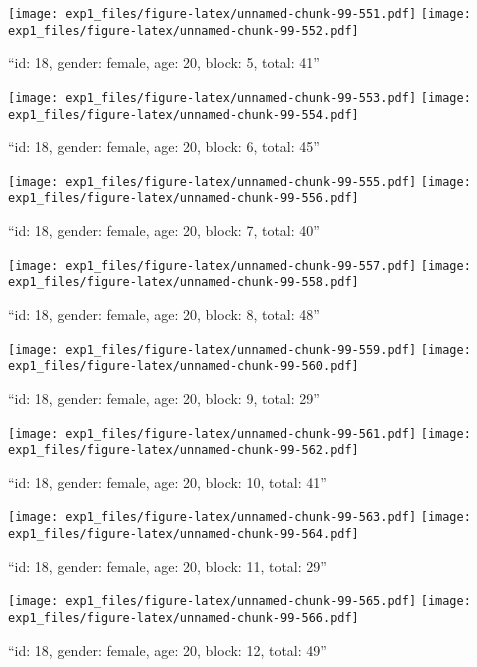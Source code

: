 \documentclass[,]{article}
\begin{document}
\texttt{[image: exp1\_files/figure-latex/unnamed-chunk-99-551.pdf]}
\texttt{[image: exp1\_files/figure-latex/unnamed-chunk-99-552.pdf]}

\newpage
[1] 

``id: 18, gender: female, age: 20, block: 5, total: 41''

\texttt{[image: exp1\_files/figure-latex/unnamed-chunk-99-553.pdf]}
\texttt{[image: exp1\_files/figure-latex/unnamed-chunk-99-554.pdf]}

\newpage
[1] 

``id: 18, gender: female, age: 20, block: 6, total: 45''

\texttt{[image: exp1\_files/figure-latex/unnamed-chunk-99-555.pdf]}
\texttt{[image: exp1\_files/figure-latex/unnamed-chunk-99-556.pdf]}

\newpage
[1] 

``id: 18, gender: female, age: 20, block: 7, total: 40''

\texttt{[image: exp1\_files/figure-latex/unnamed-chunk-99-557.pdf]}
\texttt{[image: exp1\_files/figure-latex/unnamed-chunk-99-558.pdf]}

\newpage
[1] 

``id: 18, gender: female, age: 20, block: 8, total: 48''

\texttt{[image: exp1\_files/figure-latex/unnamed-chunk-99-559.pdf]}
\texttt{[image: exp1\_files/figure-latex/unnamed-chunk-99-560.pdf]}

\newpage
[1] 

``id: 18, gender: female, age: 20, block: 9, total: 29''

\texttt{[image: exp1\_files/figure-latex/unnamed-chunk-99-561.pdf]}
\texttt{[image: exp1\_files/figure-latex/unnamed-chunk-99-562.pdf]}

\newpage
[1] 

``id: 18, gender: female, age: 20, block: 10, total: 41''

\texttt{[image: exp1\_files/figure-latex/unnamed-chunk-99-563.pdf]}
\texttt{[image: exp1\_files/figure-latex/unnamed-chunk-99-564.pdf]}

\newpage
[1] 

``id: 18, gender: female, age: 20, block: 11, total: 29''

\texttt{[image: exp1\_files/figure-latex/unnamed-chunk-99-565.pdf]}
\texttt{[image: exp1\_files/figure-latex/unnamed-chunk-99-566.pdf]}

\newpage
[1] 

``id: 18, gender: female, age: 20, block: 12, total: 49''
\end{document}
